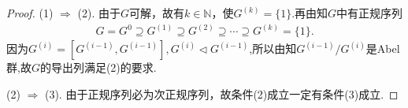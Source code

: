 \documentclass[../../main.tex]{subfiles}%
\begin{document}
\begin{proof}

(1) $\Rightarrow$ (2). 由于$G$可解，故有$k\in \mathbb{N}$，使$G^{(k)} = \{1\}$.再由知$G$中有正规序列
\begin{align*}
G =G^{0}\supseteq G^{(1)} \supseteq G^{(2)} \supseteq \cdots \supseteq G^{(k)} = \{1\}.
\end{align*}
因为$G^{\left( i \right)}=\left[ G^{\left( i-1 \right)},G^{\left( i-1 \right)} \right] ,G^{\left( i \right)}\lhd G^{\left( i-1 \right)}$,所以由知$G^{(i-1)}/G^{(i)}$是Abel群,故$G$的导出列满足(2)的要求.

(2) $\Rightarrow$ (3). 由于正规序列必为次正规序列，故条件(2)成立一定有条件(3)成立.


\end{proof}
\end{document}
